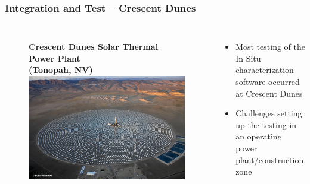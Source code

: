 \documentclass[aspectratio=169]{beamer}
\begin{document}
\begin{frame}
  \frametitle{Integration and Test -- Crescent Dunes}
  \begin{columns}[c]
    \begin{figure}
      \textbf{Crescent Dunes Solar Thermal Power Plant\\
        (Tonopah, NV)}
      \includegraphics[width=\linewidth]{CDSEP.jpg}
    \end{figure}

    \begin{itemize}
    \item Most testing of the In Situ characterization software occurred at Crescent Dunes
    \item Challenges setting up the testing in an operating power
      plant/construction zone
    \end{itemize}
  \end{columns}
\end{frame}
\end{document}
